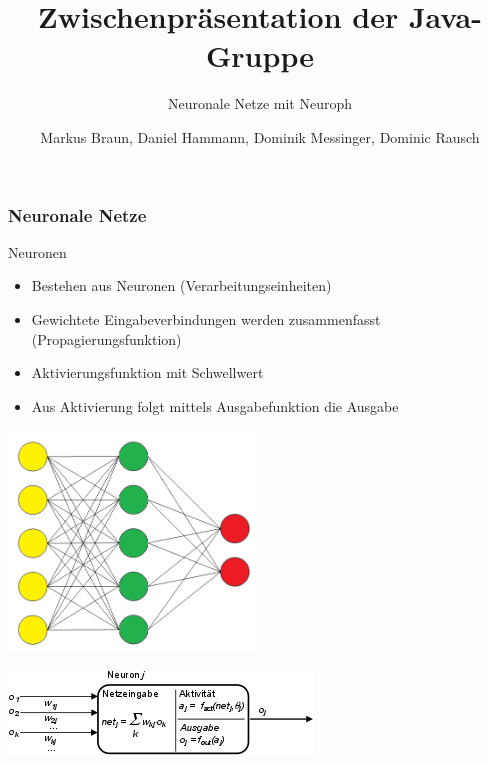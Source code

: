\documentclass[18pt]{beamer}
\title{Zwischenpräsentation der Java-Gruppe}
\subtitle{Neuronale Netze mit Neuroph}
\author{Markus Braun, Daniel Hammann, Dominik Messinger, Dominic Rausch}
\institute{Institut für Programmstrukturen und Datenorganisation (IPD), Lehrstuhl für Programmiersysteme}
\begin{document}
	\maketitle

	\begin{frame}[c]\frametitle{Neuronale Netze}
		\begin{block}{Neuronen}
		    \begin{itemize}
			    \item Bestehen aus Neuronen (Verarbeitungseinheiten)
		    	\item Gewichtete Eingabeverbindungen werden zusammenfasst (Propagierungsfunktion)
		    	\item Aktivierungsfunktion mit Schwellwert
		    	\item Aus Aktivierung folgt mittels Ausgabefunktion die Ausgabe
		    \end{itemize}		    
		\end{block}	
		\vspace{.5cm}
			\begin{minipage}[c]{0.48\textwidth}
				\begin{center}
				\includegraphics[width=0.5\textwidth]{images/ann.png}
				\end{center}
			\end{minipage}	
			\begin{minipage}[c]{0.48\textwidth}
				\begin{center}
				\includegraphics[width=\textwidth]{images/Neuron.png}
				\end{center}
			\end{minipage}
	\end{frame}
	
\end{document}
